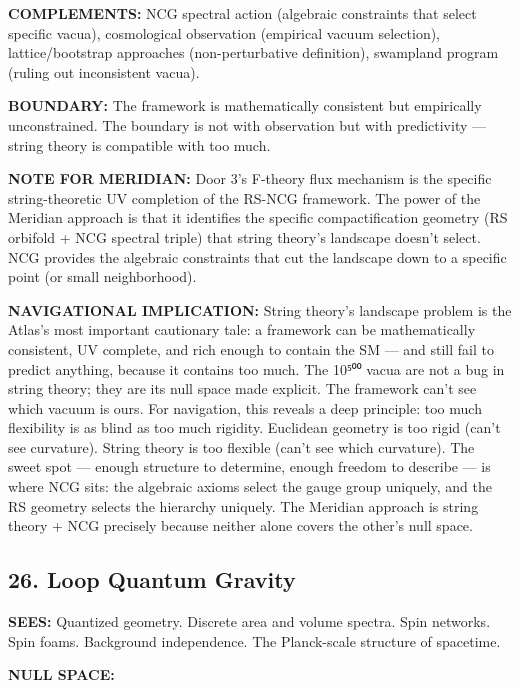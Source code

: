 \textbf{COMPLEMENTS:} NCG spectral action (algebraic constraints that select specific vacua), cosmological observation (empirical vacuum selection), lattice/\allowbreak bootstrap approaches (non-perturbative definition), swampland program (ruling out inconsistent vacua).


\textbf{BOUNDARY:} The framework is mathematically consistent but empirically unconstrained. The boundary is not with observation but with predictivity — string theory is compatible with too much.


\textbf{NOTE FOR MERIDIAN:} Door 3's F-theory flux mechanism is the specific string-theoretic UV completion of the RS-NCG framework. The power of the Meridian approach is that it identifies the specific compactification geometry (RS orbifold + NCG spectral triple) that string theory's landscape doesn't select. NCG provides the algebraic constraints that cut the landscape down to a specific point (or small neighborhood).


\textbf{NAVIGATIONAL IMPLICATION:} String theory's landscape problem is the Atlas's most important cautionary tale: a framework can be mathematically consistent, UV complete, and rich enough to contain the SM — and still fail to predict anything, because it contains too much. The 10⁵⁰⁰ vacua are not a bug in string theory; they are its null space made explicit. The framework can't see which vacuum is ours. For navigation, this reveals a deep principle: too much flexibility is as blind as too much rigidity. Euclidean geometry is too rigid (can't see curvature). String theory is too flexible (can't see which curvature). The sweet spot — enough structure to determine, enough freedom to describe — is where NCG sits: the algebraic axioms select the gauge group uniquely, and the RS geometry selects the hierarchy uniquely. The Meridian approach is string theory + NCG precisely because neither alone covers the other's null space.


\bigskip\noindent\makebox[\textwidth]{\color{rulegray}\rule{5cm}{0.3pt}}\bigskip


\subsection*{26. Loop Quantum Gravity}


\textbf{SEES:} Quantized geometry. Discrete area and volume spectra. Spin networks. Spin foams. Background independence. The Planck-scale structure of spacetime.


\textbf{NULL SPACE:}


